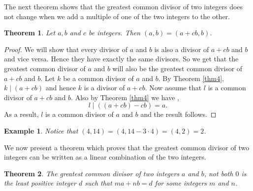 \documentclass[12pt,letterpaper]{book}
\newtheorem{theorem}{Theorem}
\newtheorem{example}{Example}
\begin{document}
The next theorem shows that the greatest common divisor of two
integers does not change when we add a multiple of one of the
two integers to the other.

\begin{theorem}
Let $a,b$ and $c$ be integers.  Then $(a,b)=(a+cb,b)$.
\end{theorem}

\begin{proof}
We will show that every divisor of $a$ and $b$ is also a divisor of
$a+cb$ and $b$ and vice versa.  Hence they have exactly the same
divisors.  So we get that the greatest common divisor of $a$ and $b$
will also be the greatest common divisor of $a+cb$ and $b$. Let $k$
be a common divisor of $a$ and $b$. By Theorem \ref{thm4},  $k \mid
(a+cb)$ and hence $k$ is a divisor of $a+cb$.  Now assume that $l$
is a common divisor of $a+cb$ and $b$. Also by Theorem \ref{thm4} we
have ,
\begin{equation*}
l\mid ((a+cb)-cb)=a.
\end{equation*}
As a result, $l$ is a common divisor of $a$ and $b$ and the result
follows.
\end{proof}

\begin{example}
Notice that $(4,14)=(4,14-3\cdot 4)=(4,2)=2$.
\end{example}

We now present a theorem which proves that the greatest common
divisor of two integers can be written as a linear combination of
the two integers.

\begin{theorem}\label{thm9}
The greatest common divisor of two integers $a$ and $b$, not both
$0$ is the least positive integer $d$ such that $ma+nb=d$ for some
integers $m$ and $n$.
\end{theorem}
\end{document}

